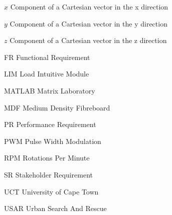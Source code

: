 \begin{Nomencl}[1cm]
    

    \item[$x$] Component of a Cartesian vector in the x direction
    \item[$y$] Component of a Cartesian vector in the y direction
    \item[$z$] Component of a Cartesian vector in the z direction

\end{Nomencl}
\clearpage
\begin{Nomencl}[1cm]
\item[FR] Functional Requirement
\item[LIM] Load Intuitive Module
\item[MATLAB] Matrix Laboratory
\item[MDF] Medium Density Fibreboard
\item[PR] Performance Requirement
\item[PWM] Pulse Width Modulation
\item[RPM] Rotations Per Minute
\item[SR] Stakeholder Requirement
\item[UCT] University of Cape Town
\item[USAR] Urban Search And Rescue




   


   

    

\end{Nomencl}
